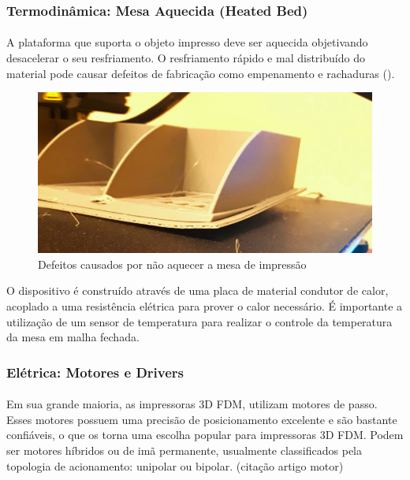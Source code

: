 \documentclass[12pt, english]{article}
\begin{document}
\subsubsection{Termodinâmica: Mesa Aquecida (Heated Bed)}

\paragraph{}
A plataforma que suporta o objeto impresso deve ser aquecida objetivando desacelerar o seu resfriamento. O resfriamento rápido e mal distribuído do material pode causar defeitos de fabricação como empenamento e rachaduras (\cite{Douglas2021}).

\begin{figure}[H]
	\centering
	\includegraphics[height=.4\linewidth]{warping.png}
	\caption{Defeitos causados por não aquecer a mesa de impressão}
\end{figure}

O dispositivo é construído através de uma placa de material condutor de calor, acoplado a uma resistência elétrica para prover o calor necessário. É importante a utilização de um sensor de temperatura para realizar o controle da temperatura da mesa em malha fechada.

\subsubsection{Elétrica: Motores e Drivers}

\paragraph{}
Em sua grande maioria, as impressoras 3D FDM, utilizam motores de passo. Esses motores possuem uma precisão de posicionamento excelente e são bastante confiáveis, o que os torna uma escolha popular para impressoras 3D FDM. Podem ser motores híbridos ou de imã permanente, usualmente classificados pela topologia de acionamento: unipolar ou bipolar. (citação artigo motor)
\end{document}
